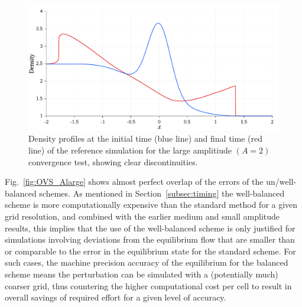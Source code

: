\begin {figure}
\centering
\includegraphics[width=13cm]{figures/OVSeps2profile}
\caption {Density profiles at the initial time (blue line) and final time (red line) of the reference simulation for the large amplitiude $(A=2)$ convergence test, showing clear discontinuities.}
\label{fig:OVS_Alarge_profile}
\end{figure}

Fig.~\ref{fig:OVS_Alarge} shows almost perfect overlap of the errors of the un/well-balanced schemes. As mentioned in Section~\ref{subsec:timing} the well-balanced scheme is more computationally expensive than the standard method for a given grid resolution, and combined with the earlier medium and small amplitude results, this implies that the use of the well-balanced scheme is only justified for simulations involving deviations from the equilibrium flow that are smaller than or comparable to the error in the equilibrium state for the standard scheme. For such cases, the machine precision accuracy of the equilibrium for the balanced scheme means the perturbation can be simulated with a (potentially much) coarser grid, thus countering the higher computational cost per cell to result in overall savings of required effort for a given level of accuracy.

